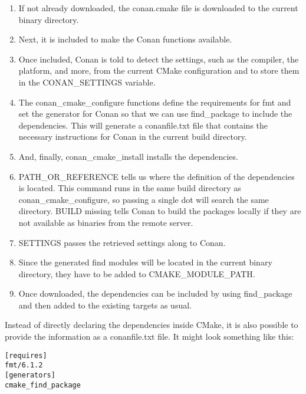 \begin{enumerate}
\item 
If not already downloaded, the conan.cmake file is downloaded to the current binary directory.

\item 
Next, it is included to make the Conan functions available.

\item 
Once included, Conan is told to detect the settings, such as the compiler, the platform, and more, from the current CMake configuration and to store them in the CONAN\_SETTINGS variable.

\item 
The conan\_cmake\_configure functions define the requirements for fmt and set the generator for Conan so that we can use find\_package to include the dependencies. This will generate a conanfile.txt file that contains the necessary instructions for Conan in the current build directory.

\item 
And, finally, conan\_cmake\_install installs the dependencies.

\item 
PATH\_OR\_REFERENCE tells us where the definition of the dependencies is located. This command runs in the same build directory as conan\_cmake\_configure, so passing a single dot will search the same directory. BUILD missing tells Conan to build the packages locally if they are not available as binaries from the remote server.

\item 
SETTINGS passes the retrieved settings along to Conan.

\item 
Since the generated find modules will be located in the current binary directory, they have to be added to CMAKE\_MODULE\_PATH.

\item 
Once downloaded, the dependencies can be included by using find\_package and then added to the existing targets as usual.
\end{enumerate}

Instead of directly declaring the dependencies inside CMake, it is also possible to provide the information as a conanfile.txt file. It might look something like this:

\begin{lstlisting}[style=styleCMake]
[requires]
fmt/6.1.2
[generators]
cmake_find_package
\end{lstlisting}
 
